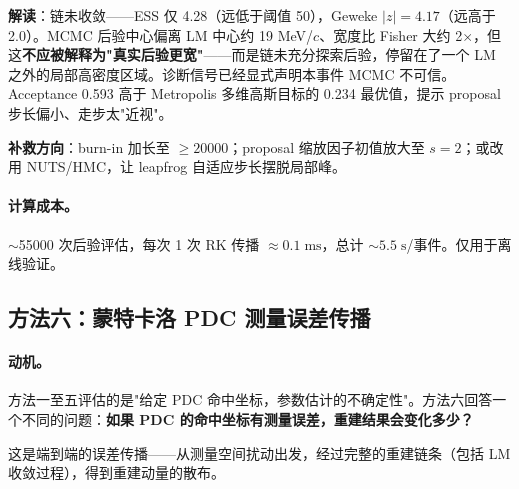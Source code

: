\documentclass[a4paper, 11pt]{article}
\begin{document}
\textbf{解读}：链未收敛——ESS 仅 4.28（远低于阈值 50），Geweke $|z| = 4.17$（远高于 2.0）。MCMC 后验中心偏离 LM 中心约 19 MeV/$c$、宽度比 Fisher 大约 2$\times$，但这\textbf{不应被解释为"真实后验更宽"}——而是链未充分探索后验，停留在了一个 LM 之外的局部高密度区域。诊断信号已经显式声明本事件 MCMC 不可信。Acceptance 0.593 高于 Metropolis 多维高斯目标的 0.234 最优值，提示 proposal 步长偏小、走步太"近视"。

\textbf{补救方向}：burn-in 加长至 $\geq 20000$；proposal 缩放因子初值放大至 $s = 2$；或改用 NUTS/HMC，让 leapfrog 自适应步长摆脱局部峰。

\paragraph{计算成本。} $\sim$55000 次后验评估，每次 1 次 RK 传播 $\approx 0.1\;\mathrm{ms}$，总计 $\sim 5.5\;\mathrm{s}$/事件。仅用于离线验证。

\subsection{方法六：蒙特卡洛 PDC 测量误差传播}
\label{sec:mc_pdc}

\paragraph{动机。}
方法一至五评估的是"给定 PDC 命中坐标，参数估计的不确定性"。方法六回答一个不同的问题：\textbf{如果 PDC 的命中坐标有测量误差，重建结果会变化多少？}

这是端到端的误差传播——从测量空间扰动出发，经过完整的重建链条（包括 LM 收敛过程），得到重建动量的散布。
\end{document}
